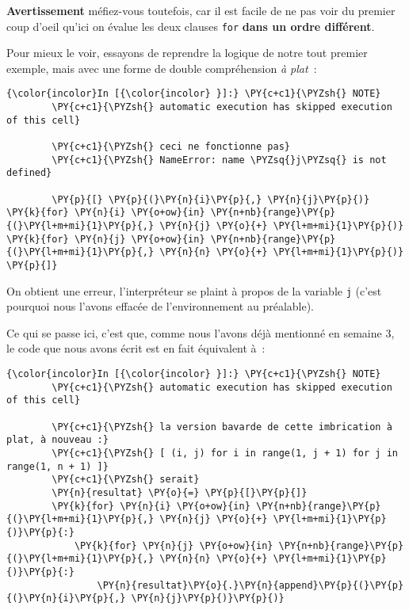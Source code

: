     \textbf{Avertissement} méfiez-vous toutefois, car il est facile de ne
pas voir du premier coup d'oeil qu'ici on évalue les deux clauses
\texttt{for} \textbf{dans un ordre différent}.

    Pour mieux le voir, essayons de reprendre la logique de notre tout
premier exemple, mais avec une forme de double compréhension \emph{à
plat}~:

    \begin{Verbatim}[commandchars=\\\{\}]
{\color{incolor}In [{\color{incolor} }]:} \PY{c+c1}{\PYZsh{} NOTE}
        \PY{c+c1}{\PYZsh{} automatic execution has skipped execution of this cell}
        
        \PY{c+c1}{\PYZsh{} ceci ne fonctionne pas}
        \PY{c+c1}{\PYZsh{} NameError: name \PYZsq{}j\PYZsq{} is not defined}
        
        \PY{p}{[} \PY{p}{(}\PY{n}{i}\PY{p}{,} \PY{n}{j}\PY{p}{)} \PY{k}{for} \PY{n}{i} \PY{o+ow}{in} \PY{n+nb}{range}\PY{p}{(}\PY{l+m+mi}{1}\PY{p}{,} \PY{n}{j} \PY{o}{+} \PY{l+m+mi}{1}\PY{p}{)} \PY{k}{for} \PY{n}{j} \PY{o+ow}{in} \PY{n+nb}{range}\PY{p}{(}\PY{l+m+mi}{1}\PY{p}{,} \PY{n}{n} \PY{o}{+} \PY{l+m+mi}{1}\PY{p}{)} \PY{p}{]}
\end{Verbatim}


    On obtient une erreur, l'interpréteur se plaint à propos de la variable
\texttt{j} (c'est pourquoi nous l'avons effacée de l'environnement au
préalable).

    Ce qui se passe ici, c'est que, comme nous l'avons déjà mentionné en
semaine 3, le code que nous avons écrit est en fait équivalent à~:

    \begin{Verbatim}[commandchars=\\\{\}]
{\color{incolor}In [{\color{incolor} }]:} \PY{c+c1}{\PYZsh{} NOTE}
        \PY{c+c1}{\PYZsh{} automatic execution has skipped execution of this cell}
        
        \PY{c+c1}{\PYZsh{} la version bavarde de cette imbrication à plat, à nouveau :}
        \PY{c+c1}{\PYZsh{} [ (i, j) for i in range(1, j + 1) for j in range(1, n + 1) ]}
        \PY{c+c1}{\PYZsh{} serait}
        \PY{n}{resultat} \PY{o}{=} \PY{p}{[}\PY{p}{]}
        \PY{k}{for} \PY{n}{i} \PY{o+ow}{in} \PY{n+nb}{range}\PY{p}{(}\PY{l+m+mi}{1}\PY{p}{,} \PY{n}{j} \PY{o}{+} \PY{l+m+mi}{1}\PY{p}{)}\PY{p}{:}
            \PY{k}{for} \PY{n}{j} \PY{o+ow}{in} \PY{n+nb}{range}\PY{p}{(}\PY{l+m+mi}{1}\PY{p}{,} \PY{n}{n} \PY{o}{+} \PY{l+m+mi}{1}\PY{p}{)}\PY{p}{:}
                \PY{n}{resultat}\PY{o}{.}\PY{n}{append}\PY{p}{(}\PY{p}{(}\PY{n}{i}\PY{p}{,} \PY{n}{j}\PY{p}{)}\PY{p}{)}
\end{Verbatim}


